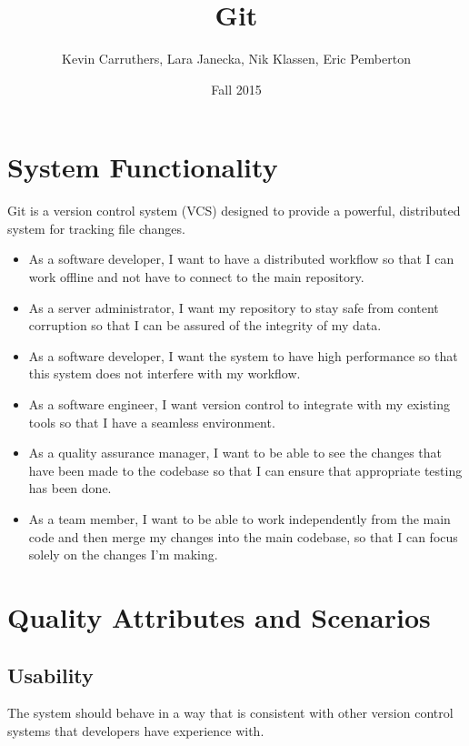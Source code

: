 \documentclass[12pt]{article}
\begin{document}
\title{Git}
\author{Kevin Carruthers, Lara Janecka, Nik Klassen, Eric Pemberton}
\date{\vspace{-2ex}Fall 2015}
\maketitle\HRule

\tableofcontents
\newpage

\section{System Functionality}
Git is a version control system (VCS) designed to provide a powerful, distributed system for tracking file changes.

\begin{itemize}
\item As a software developer, I want to have a distributed workflow so that I can work offline and not have to connect to the main repository.
\item As a server administrator,  I want my repository to stay safe from content corruption so that I can be assured of the integrity of my data.
\item As a software developer, I want the system to have high performance so that this system does not interfere with my workflow.
\item As a software engineer, I want version control to integrate with my existing tools so that I have a seamless environment.
\item As a quality assurance manager, I want to be able to see the changes that have been made to the codebase so that I can ensure that appropriate testing has been done.
\item As a team member, I want to be able to work independently from the main code and then merge my changes into the main codebase, so that I can focus solely on the changes I’m making.
\end{itemize}

\section{Quality Attributes and Scenarios}
\subsection{Usability}
The system should behave in a way that is consistent with other version control systems that developers have experience with.
\end{document}
